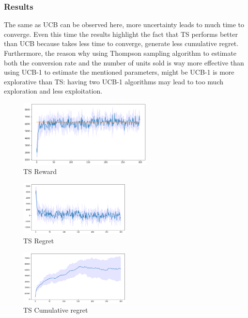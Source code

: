 \subsubsection{Results}
The same as UCB can be observed here, more uncertainty leads to much time to converge. Even this time the results highlight the fact that TS performs better than UCB because takes less time to converge, generate less cumulative regret.\\ Furthermore, the reason why using Thompson sampling algorithm to estimate both the conversion rate and the number of units sold is way more effective than using UCB-1 to estimate the mentioned parameters, might be UCB-1 is more explorative than TS: having two UCB-1 algorithms may lead to too much exploration and less exploitation.
\begin{figure}[ht]
    \begin{center}
    \includegraphics[width=0.6\textwidth]{img/TS4.png}
    \caption{TS Reward}
    \label{fig:reward42}
    \end{center}
\end{figure}
\begin{multicols}{2}
    \begin{figure}[H]
        \begin{center}
        \includegraphics[width=0.5\textwidth]{img/TS4_regret.png}
        \caption{TS Regret}
        \label{fig:regret42}
        \end{center}
    \end{figure}
    \columnbreak
    \begin{figure}[H]
        \begin{center}
        \includegraphics[width=0.5\textwidth]{img/TS4_cum_reg.png}
        \caption{TS Cumulative regret}
        \label{fig:cum_reg42}
        \end{center}
    \end{figure}
\end{multicols}